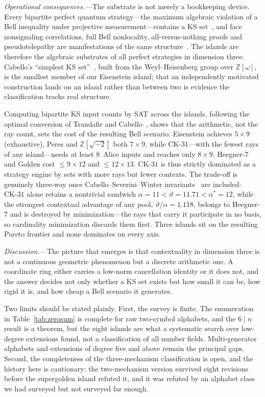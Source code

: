 \documentclass[twocolumn,prl,superscriptaddress,nofootinbib]{revtex4-2}
\newcommand{\Z}{\mathbb{Z}}
\newcommand{\CK}{\mathrm{CK}\text{-}31}
\begin{document}
\textit{Operational consequences.---}The substrate is not merely a bookkeeping
device.  Every bipartite perfect quantum strategy---the maximum algebraic
violation of a Bell inequality under projective measurement---contains a KS
set~\cite{Cabello2024bipartite}, and face nonsignaling correlations, full Bell
nonlocality, all-versus-nothing proofs and pseudotelepathy are manifestations of
the same structure~\cite{Cabello2024equivalences}.  The islands are therefore the
algebraic substrates of all perfect strategies in dimension three.  Cabello's
``simplest KS set''~\cite{Cabello2025simplest}, built from the Weyl--Heisenberg
group over $\Z[\omega]$, is the smallest member of our Eisenstein island; that an
independently motivated construction lands on an island rather than between two is
evidence the classification tracks real structure.

Computing bipartite KS input counts by SAT across the islands, following the
optimal conversion of Trandafir and Cabello~\cite{TrandafirCabello2025optimal},
shows that the arithmetic, not the ray count, sets the cost of the resulting Bell
scenario.
Eisenstein achieves $5\times9$ (exhaustive), Peres and $\Z[\sqrt{-2}]$ both
$7\times9$, while $\CK$---with the fewest rays of any island---needs at least
8~Alice inputs and reaches only $8\times9$.  Heegner-7 and Golden cost
$\leq 9\times12$ and $\leq 12\times13$.  $\CK$ is thus strictly dominated as a
strategy engine by sets with more rays but fewer contexts.  The trade-off is
genuinely three-way once Cabello--Severini--Winter invariants~\cite{CabelloSeveriniWinter2014}
are included: $\CK$ alone retains a nontrivial sandwich
$\alpha=11<\vartheta=11.71<\alpha^*=12$, while the strongest contextual advantage
of any pool, $\vartheta/\alpha=1.118$, belongs to Heegner-7 and is destroyed by
minimization---the rays that carry it participate in no basis, so cardinality
minimization discards them first.  Three islands sit on the resulting Pareto
frontier and none dominates on every axis.

\textit{Discussion.---}The picture that emerges is that contextuality in dimension
three is not a continuous geometric phenomenon but a discrete arithmetic one.  A
coordinate ring either carries a low-norm cancellation identity or it does not,
and the answer decides not only whether a KS set exists but how small it can be,
how rigid it is, and how cheap a Bell scenario it generates.

Two limits should be stated plainly.  First, the survey is finite.  The
enumeration in Table~\ref{tab:zerosum} is complete for raw two-symbol alphabets,
and the $6\mid n$ result is a theorem, but the eight islands are what a systematic
search over low-degree extensions found, not a classification of all number
fields.  Multi-generator alphabets and extensions of degree five and above remain
the principal gaps.  Second, the completeness of the three-mechanism
classification is open, and the history here is cautionary: the two-mechanism
version survived eight revisions before the supergolden island refuted it, and it
was refuted by an alphabet class we had surveyed but not surveyed far enough.
\end{document}
